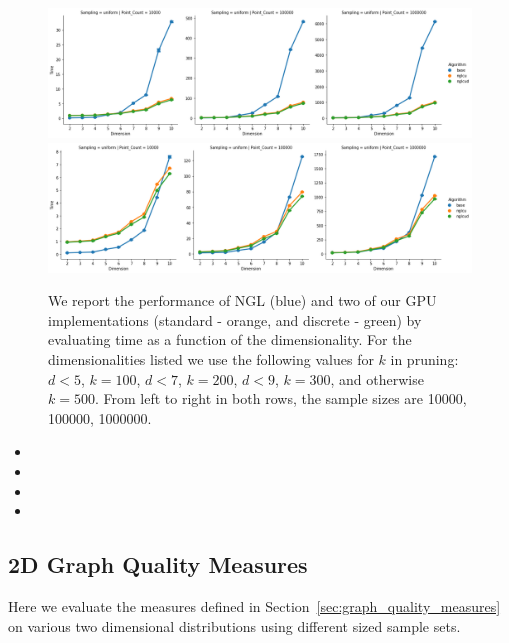 \begin{figure}
    \includegraphics[width=0.8\linewidth]{figs/chap7/strict_performance_d.png}
    \includegraphics[width=0.8\linewidth]{figs/chap7/relaxed_performance_d.png}
    \caption{We report the performance of NGL (blue) and two of our GPU
    implementations (standard - orange, and discrete - green) by
    evaluating time as a function of the dimensionality. For the
    dimensionalities listed we use the following values for $k$ in
    pruning: $d < 5$, $k=100$, $d < 7$, $k=200$, $d < 9$, $k=300$, and
    otherwise $k=500$. From left to right in both rows, the sample sizes
    are 10000, 100000, 1000000.}
    \label{fig:performance}
\end{figure}

\begin{itemize}
    \item {}
    \item {}
    \item {}
    \item {}
\end{itemize}

\subsection{2D Graph Quality Measures}

Here we evaluate the measures defined in Section~\ref{sec:graph_quality_measures}
on various two dimensional distributions using different sized sample sets.

